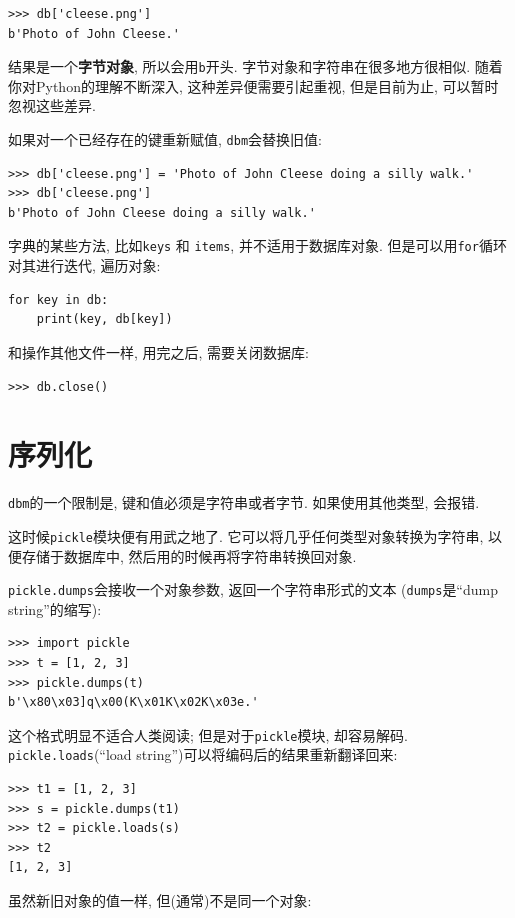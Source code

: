 \documentclass[10pt]{book}
\begin{document}
\begin{verbatim}
>>> db['cleese.png']
b'Photo of John Cleese.'
\end{verbatim}
%
结果是一个{\bf 字节对象}, 所以会用{\tt b}开头. 
字节对象和字符串在很多地方很相似. 
随着你对Python的理解不断深入, 这种差异便需要引起重视, 但是目前为止, 
可以暂时忽视这些差异. 

如果对一个已经存在的键重新赋值, {\tt dbm}会替换旧值:

\begin{verbatim}
>>> db['cleese.png'] = 'Photo of John Cleese doing a silly walk.'
>>> db['cleese.png']
b'Photo of John Cleese doing a silly walk.'
\end{verbatim}
%

字典的某些方法, 比如{\tt keys} 和 {\tt items}, 
并不适用于数据库对象. 但是可以用{\tt for}循环对其进行迭代, 遍历对象:

\begin{verbatim}
for key in db:
    print(key, db[key])
\end{verbatim}
%
和操作其他文件一样, 用完之后, 需要关闭数据库:

\begin{verbatim}
>>> db.close()
\end{verbatim}
%


\section{序列化}

{\tt dbm}的一个限制是, 键和值必须是字符串或者字节. 
如果使用其他类型, 会报错. 
 

这时候{\tt pickle}模块便有用武之地了. 
它可以将几乎任何类型对象转换为字符串, 以便存储于数据库中, 
然后用的时候再将字符串转换回对象. 

{\tt pickle.dumps}会接收一个对象参数, 返回一个字符串形式的文本
({\tt dumps}是``dump string''的缩写):

\begin{verbatim}
>>> import pickle
>>> t = [1, 2, 3]
>>> pickle.dumps(t)
b'\x80\x03]q\x00(K\x01K\x02K\x03e.'
\end{verbatim}
%

这个格式明显不适合人类阅读; 但是对于{\tt pickle}模块, 却容易解码. 
{\tt pickle.loads}(``load string'')可以将编码后的结果重新翻译回来:

\begin{verbatim}
>>> t1 = [1, 2, 3]
>>> s = pickle.dumps(t1)
>>> t2 = pickle.loads(s)
>>> t2
[1, 2, 3]
\end{verbatim}
%
虽然新旧对象的值一样, 但(通常)不是同一个对象:
\end{document}
